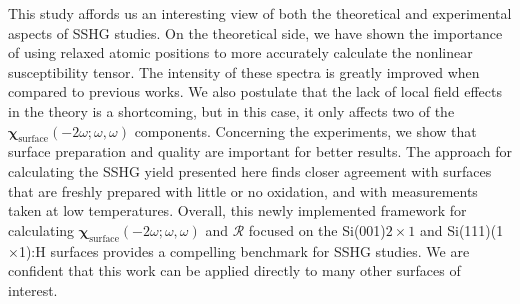 This study affords us an interesting view of both the theoretical and
experimental aspects of SSHG studies. On the theoretical side, we have shown the
importance of using relaxed atomic positions to more accurately calculate the
nonlinear susceptibility tensor. The intensity of these spectra is greatly
improved when compared to previous works.\cite{mejiaPRB02} We also postulate
that the lack of local field effects in the theory is a shortcoming, but in this
case, it only affects two of the
$\boldsymbol{\chi}_{\mathrm{surface}}(-2\omega;\omega,\omega)$ components.
Concerning the experiments, we show that surface preparation and quality are
important for better results. The approach for calculating the SSHG yield
presented here finds closer agreement with surfaces that are freshly prepared
with little or no oxidation, and with measurements taken at low temperatures.
Overall, this newly implemented framework for calculating
$\boldsymbol{\chi}_{\mathrm{surface}}(-2\omega;\omega,\omega)$ and $\mathcal{R}$
focused on the Si(001)$2\times 1$ and  Si(111)(1$\times$1):H surfaces provides a
compelling benchmark for SSHG studies. We are confident that this work can be
applied directly to many other surfaces of interest.

\stopcontents[chapters]
